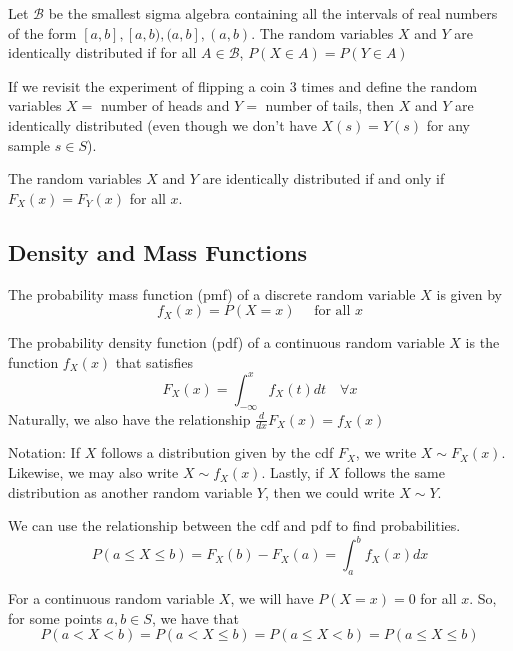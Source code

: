 \begin{definition}
    Let $\mathcal{B}$ be the smallest sigma algebra containing all the intervals of real numbers of the form $[a,b], [a,b),(a,b], (a,b)$. The random variables $X$ and $Y$ are identically distributed if for all $A \in \mathcal{B}$, $P(X\in A) = P(Y\in A)$
\end{definition}

\begin{example}
    If we revisit the experiment of flipping a coin 3 times and define the random variables $X =$ number of heads and $Y =$ number of tails, then $X$ and $Y$ are identically distributed (even though we don't have $X(s) = Y(s)$ for any sample $s \in S$).
\end{example}

\begin{theorem}
    The random variables $X$ and $Y$ are identically distributed if and only if $F_X(x) = F_Y(x)$ for all $x$.
\end{theorem}
\bigskip


\subsection*{Density and Mass Functions}
\begin{definition}
    The probability mass function (pmf) of a discrete random variable $X$ is given by
    \[
    f_X(x) = P(X= x) \quad \text{ for all } x
    \]
\end{definition}

\begin{definition}
    The probability density function (pdf) of a continuous random variable $X$ is the function $f_X(x)$ that satisfies 
    \[
    F_X(x) = \int_{-\infty}^{x}{f_X(t)dt} \quad \forall x
    \]
    Naturally, we also have the relationship $\frac{d}{dx}F_X(x)= f_X(x)$
\end{definition}

Notation: If $X$ follows a distribution given by the cdf $F_X$, we write $X \sim F_X(x)$. Likewise, we may also write $X \sim f_X(x)$. Lastly, if $X$ follows the same distribution as another random variable $Y$, then we could write $X\sim Y$.
\nextp

We can use the relationship between the cdf and pdf to find probabilities.
\[
P(a \leq X \leq b) = F_X(b) - F_X(a) = \int_{a}^{b}{f_X(x)dx}
\]

For a continuous random variable $X$, we will have $P(X = x) = 0$ for all $x$. So, for some points $a, b \in S$, we have that
\[
P(a < X < b) = P(a < X \leq b) = P(a \leq X < b) = P(a \leq X \leq b)
\]

